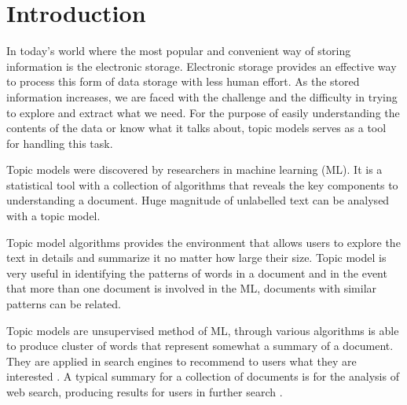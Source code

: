 \chapter{Introduction}

%
%
%

In today's world where the most popular and convenient way of storing information is the electronic storage. Electronic storage provides an effective way to process this form of data storage with less human effort. As the stored information increases, we are faced with the challenge and the difficulty in trying to explore and extract what we need. For the purpose of easily understanding the contents of the data or know what it talks about, topic models serves as a tool for handling this task.

Topic models were discovered by researchers in  machine learning (ML).  It is a statistical tool with a collection of algorithms that reveals the key components to understanding a document. Huge magnitude of unlabelled text can be analysed with a topic model.

Topic model algorithms provides the environment that allows   users to explore the text in details and summarize it no matter how large their size. Topic model is very useful in identifying the patterns of words in a document and in the event that more than one document is involved in the ML, documents with similar patterns can be related. 

Topic models are unsupervised method of ML, through various algorithms is able to produce cluster of words that represent somewhat a summary of a document. They are applied in search engines to recommend to users what they are interested . A typical summary for a collection of documents is for the analysis of web search, producing results for users in further search \citep{turpin2007fast} . %

